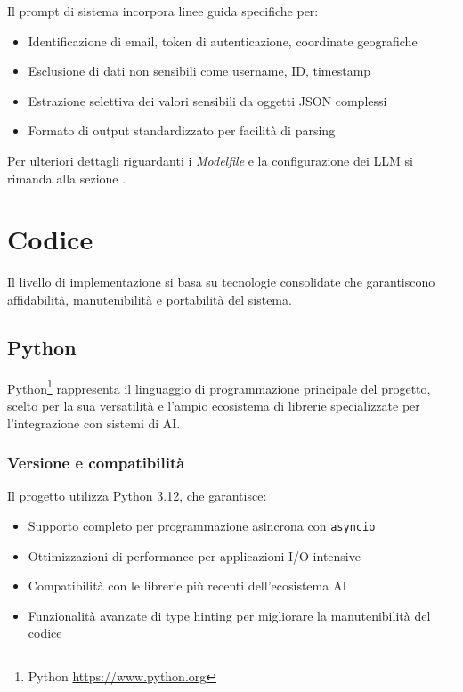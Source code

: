 \documentclass[12pt]{report}
\begin{document}
Il prompt di sistema incorpora linee guida specifiche per:
\begin{itemize}
    \item Identificazione di email, token di autenticazione, coordinate geografiche
    \item Esclusione di dati non sensibili come username, ID, timestamp
    \item Estrazione selettiva dei valori sensibili da oggetti JSON complessi
    \item Formato di output standardizzato per facilità di parsing
\end{itemize}

Per ulteriori dettagli riguardanti i \textit{Modelfile} e la configurazione dei LLM si rimanda alla sezione .


\section{Codice}
\label{sec:codice}

Il livello di implementazione si basa su tecnologie consolidate che garantiscono affidabilità, manutenibilità e portabilità del sistema.

\subsection{Python}
\label{subsec:python}

Python\footnote{Python \url{https://www.python.org}} rappresenta il linguaggio di programmazione principale del progetto, scelto per la sua versatilità e l'ampio ecosistema di librerie specializzate per l'integrazione con sistemi di AI.

\subsubsection{Versione e compatibilità}
Il progetto utilizza Python 3.12, che garantisce:
\begin{itemize}
    \item Supporto completo per programmazione asincrona con \texttt{asyncio}
    \item Ottimizzazioni di performance per applicazioni I/O intensive
    \item Compatibilità con le librerie più recenti dell'ecosistema AI
    \item Funzionalità avanzate di type hinting per migliorare la manutenibilità del codice
\end{itemize}
\end{document}
